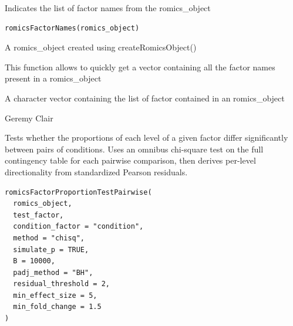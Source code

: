 \documentclass[a4paper]{book}
\begin{document}
%
\begin{Description}
Indicates the list of factor names from the romics\_object
\end{Description}
%
\begin{Usage}
\begin{verbatim}
romicsFactorNames(romics_object)
\end{verbatim}
\end{Usage}
%
\begin{Arguments}
\begin{ldescription}
\item[\code{romics\_object}] A romics\_object created using createRomicsObject()
\end{ldescription}
\end{Arguments}
%
\begin{Details}
This function allows to quickly get a vector containing all the factor names present in a romics\_object
\end{Details}
%
\begin{Value}
A character vector containing the list of factor contained in an romics\_object
\end{Value}
%
\begin{Author}
Geremy Clair
\end{Author}
%
\begin{Description}
Tests whether the proportions of each level of a given factor differ
significantly between pairs of conditions. Uses an omnibus chi-square test on the
full contingency table for each pairwise comparison, then derives per-level
directionality from standardized Pearson residuals.
\end{Description}
%
\begin{Usage}
\begin{verbatim}
romicsFactorProportionTestPairwise(
  romics_object,
  test_factor,
  condition_factor = "condition",
  method = "chisq",
  simulate_p = TRUE,
  B = 10000,
  padj_method = "BH",
  residual_threshold = 2,
  min_effect_size = 5,
  min_fold_change = 1.5
)
\end{verbatim}
\end{Usage}
%
\end{document}
